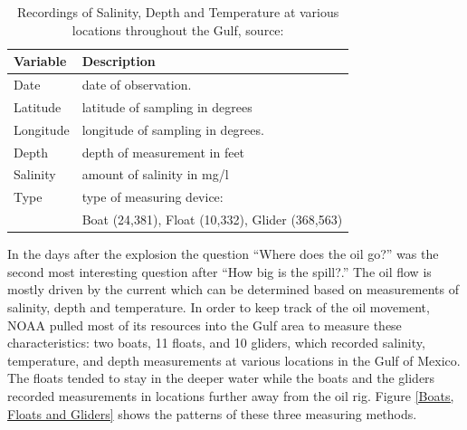 \documentclass[authoryear,12pt]{elsarticle}
\begin{document}
\begin{table}
\begin{tabular}{lp{9.5cm}}\hline
\bf Variable & \bf Description \\\hline
Date & date of observation. \\
Latitude & latitude {of sampling} in degrees \\
Longitude & longitude {of sampling} in degrees. \\
Depth & depth of measurement in feet \\
Salinity &  amount of salinity in mg/l \\
Type &  type of measuring device: \\
& {\small Boat (24,381), Float (10,332), Glider (368,563)} \\\hline
\end{tabular}
\label{table.salinity}
\caption{Recordings of Salinity, Depth and Temperature at various locations throughout the Gulf, source: \citet{salinity}}
\end{table}

In the days after the explosion the question ``Where does the oil go?'' was the second most interesting question after ``How big is the spill?.''  The oil flow is mostly driven by the current which can be determined based on measurements of salinity, depth and temperature. 
In order to keep track of the oil movement, NOAA pulled most of its resources into the Gulf area to measure these characteristics: {two} boats, 11 floats, and 10 gliders, which recorded salinity, temperature, and depth measurements at various locations in the Gulf of Mexico. 
The floats tended to stay in the deeper water while the boats and the gliders recorded measurements in locations further away from the oil rig.  Figure \ref{Boats, Floats and Gliders} show{s} the patterns of these three measuring methods. 
\end{document}
